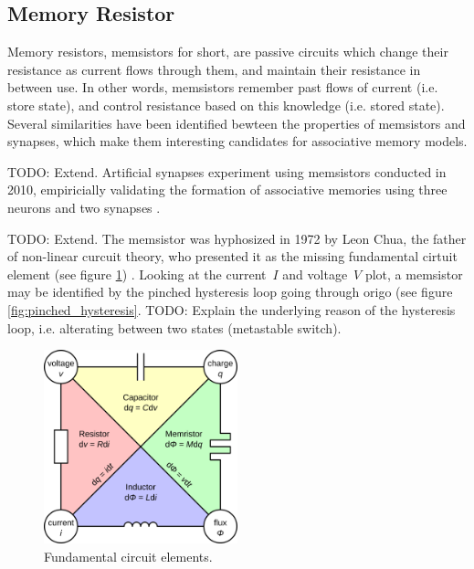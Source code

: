 \documentclass[12pt, a4paper]{article}
\begin{document}

\subsection{Memory Resistor}


Memory resistors, memsistors for short, are passive circuits which change their resistance as current flows through them, and maintain their resistance in between use. In other words, memsistors remember past flows of current (i.e. store state), and control resistance based on this knowledge (i.e. stored state). Several similarities have been identified bewteen the properties of memsistors and synapses, which make them interesting candidates for associative memory models.

TODO: Extend. Artificial synapses experiment using memsistors conducted in 2010, empiricially validating the formation of associative memories using three neurons and two synapses \cite{memristor_conditioning}.

TODO: Extend. The memsistor was hyphosized in 1972 by Leon Chua, the father of non-linear curcuit theory, who presented it as the missing fundamental cirtuit element (see figure \ref{fig:circuit_elements}) \cite{chua_memristor}. Looking at the current~$I$ and voltage~$V$ plot, a memsistor may be identified by the pinched hysteresis loop going through origo (see figure \ref{fig:pinched_hysteresis}. TODO: Explain the underlying reason of the hysteresis loop, i.e. alterating between two states (metastable switch).

\begin{figure}[htbp]
	\begin{center}
		\includegraphics[width=0.5\textwidth]{inc/circuit_elements.png}
		\caption{Fundamental circuit elements.\protect\footnotemark}
		\label{fig:circuit_elements}
	\end{center}
\end{figure}
\end{document}
